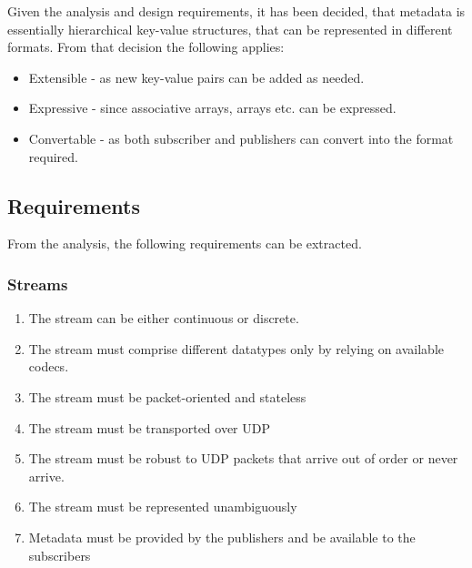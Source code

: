 Given the analysis and design requirements, it has been decided, that metadata is essentially hierarchical key-value structures, that can be represented in different formats. From that decision the following applies:
\begin{itemize}
	\item Extensible - as new key-value pairs can be added as needed.
	\item Expressive - since associative arrays, arrays etc. can be expressed.
	\item Convertable - as both subscriber and publishers can convert into the format required.
\end{itemize}

\subsection{Requirements}
From the analysis, the following requirements can be extracted.
\subsubsection{Streams}
\begin{enumerate}
	\item The stream can be either continuous or discrete.
	\item The stream must comprise different datatypes only by relying on available codecs.
	\item The stream must be packet-oriented and stateless
	\item The stream must be transported over UDP
	\item The stream must be robust to UDP packets that arrive out of order or never arrive.
	\item The stream must be represented unambiguously
	\item Metadata must be provided by the publishers and be available to the subscribers 
\end{enumerate}
\todo{Table of requirements[Where it's defined][Where it's tested][Whether it passes}

